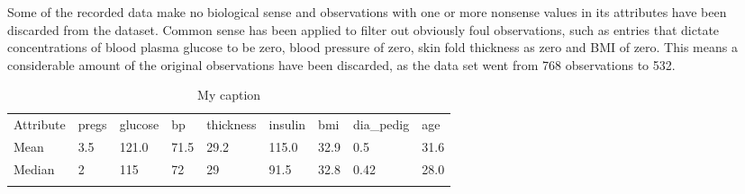 Some of the recorded data make no biological sense and observations with one or
more nonsense values in its attributes have been discarded from the dataset.
Common sense has been applied to filter out obviously foul observations, such
as entries that dictate concentrations of blood plasma glucose to be zero, blood
pressure of zero, skin fold thickness as zero and BMI of zero. This means a
considerable amount of the original observations have been discarded, as the
data set went from 768 observations to 532.
\bigskip

\begin{table}[]
\centering
\caption{My caption}
\label{my-label}
\begin{tabular}{lllllllll}
\cline{1-1}
\multicolumn{1}{|l|}{Attribute} & pregs & glucose & bp   & thickness & insulin & bmi  & dia\_pedig & age  \\ \cline{1-1}
\multicolumn{1}{|l|}{Mean}      & 3.5   & 121.0   & 71.5 & 29.2      & 115.0   & 32.9 & 0.5        & 31.6 \\ \cline{1-1}
\multicolumn{1}{|l|}{Median}    & 2     & 115     & 72   & 29        & 91.5    & 32.8 & 0.42       & 28.0 \\ \cline{1-1}
                                                       &       &         &      &           &         &      &            &      \\ \hline
\end{tabular}
\end{table}
